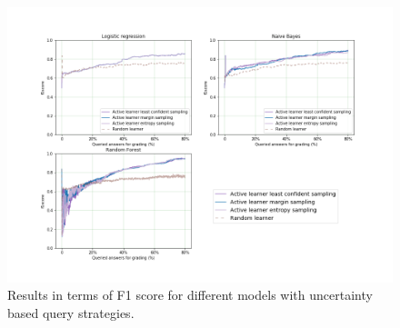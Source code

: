  \begin{figure}[!htb]
 	\centering
 	\includegraphics[scale=0.46]{images/binary/task2_f1score_uncertainty}
 	\caption{Results in terms of F1 score for different models with uncertainty based query strategies.}
 	\label{t2_b_uncertainty_f1}
 \end{figure}
 

